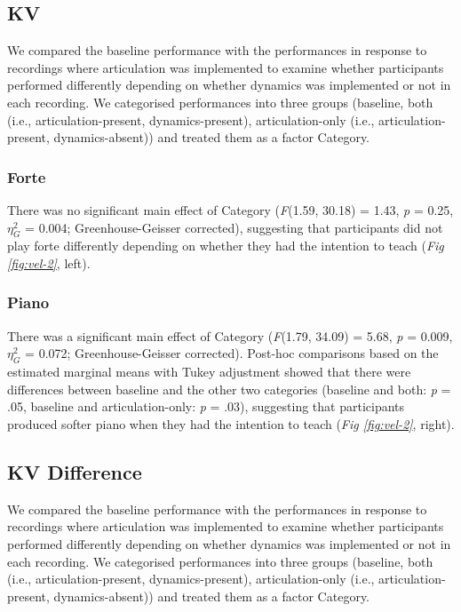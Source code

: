 \documentclass[
  man,floatsintext]{apa6}
\begin{document}
\hypertarget{kv-1}{%
\subsection{KV}\label{kv-1}}

We compared the baseline performance with the performances in response to recordings where articulation was implemented to examine whether participants performed differently depending on whether dynamics was implemented or not in each recording. We categorised performances into three groups (baseline, both (i.e., articulation-present, dynamics-present), articulation-only (i.e., articulation-present, dynamics-absent)) and treated them as a factor Category.

\hypertarget{forte-1}{%
\subsubsection{Forte}\label{forte-1}}

There was no significant main effect of Category (\emph{F}(1.59, 30.18) = 1.43, \emph{p} = 0.25, \(\eta_G^2\) = 0.004; Greenhouse-Geisser corrected), suggesting that participants did not play forte differently depending on whether they had the intention to teach (\emph{Fig \ref{fig:vel-2}}, left).

\hypertarget{piano-1}{%
\subsubsection{Piano}\label{piano-1}}

There was a significant main effect of Category (\emph{F}(1.79, 34.09) = 5.68, \emph{p} = 0.009, \(\eta_G^2\) = 0.072; Greenhouse-Geisser corrected). Post-hoc comparisons based on the estimated marginal means with Tukey adjustment showed that there were differences between baseline and the other two categories (baseline and both: \emph{p} = .05, baseline and articulation-only: \emph{p} = .03), suggesting that participants produced softer piano when they had the intention to teach (\emph{Fig \ref{fig:vel-2}}, right).

\hypertarget{kv-difference-1}{%
\subsection{KV Difference}\label{kv-difference-1}}

We compared the baseline performance with the performances in response to recordings where articulation was implemented to examine whether participants performed differently depending on whether dynamics was implemented or not in each recording. We categorised performances into three groups (baseline, both (i.e., articulation-present, dynamics-present), articulation-only (i.e., articulation-present, dynamics-absent)) and treated them as a factor Category.
\end{document}
